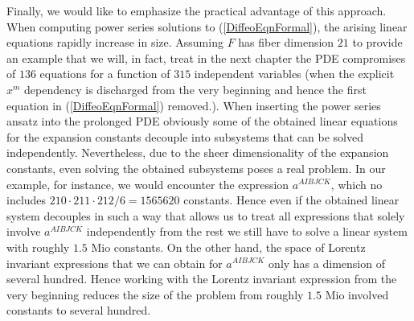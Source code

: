 \documentclass[a4paper,12pt, DIV=14, BCOR=5mm, twoside, headsepline, numbers=noenddot]{scrbook}
\begin{document}
Finally, we would like to emphasize the practical advantage of this approach. When computing power series solutions to (\ref{DiffeoEqnFormal}), the arising linear equations rapidly increase in size. Assuming $F$ has fiber dimension $21$ to provide an example that we will, in fact, treat in the next chapter the PDE compromises of $136$ equations for a function of $315$ independent variables (when the explicit $x^m$ dependency is discharged from the very beginning and hence the first equation in (\ref{DiffeoEqnFormal}) removed.).  When inserting the power series ansatz into the prolonged PDE obviously some of the obtained linear equations for the expansion constants decouple into subsystems that can be solved independently. Nevertheless, due to the sheer dimensionality of the expansion constants, even solving the obtained subsystems poses a real problem. In our example, for instance, we would encounter the expression $a^{AIBJCK}$, which no includes $210\cdot 211\cdot212/6=1565620$ constants. Hence even if the obtained linear system decouples in such a way that allows us to treat all expressions that solely involve $a^{AIBJCK}$ independently from the rest we still have to solve a linear system with roughly $1.5$ Mio constants. On the other hand, the space of Lorentz invariant expressions that we can obtain for $a^{AIBJCK}$ only has a dimension of several hundred. Hence working with the Lorentz invariant expression from the very beginning reduces the size of the problem from roughly $1.5$ Mio involved constants to several hundred. 
\end{document}
